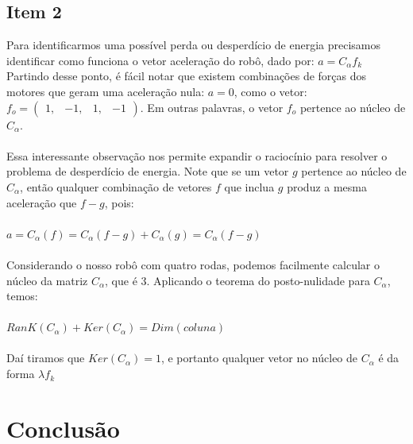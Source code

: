 \documentclass{article}
\begin{document}
\subsection{Item 2}
Para identificarmos uma possível perda ou desperdício de energia precisamos identificar como funciona o vetor aceleração do robô, dado por: 
$ a = C_{\alpha}f_{k}$ Partindo desse ponto, é fácil notar que existem combinações de forças dos motores que geram uma aceleração nula:
$ a = 0 $, como o vetor: $f_{o} = \begin{pmatrix} 1,&-1,&1,&-1\end{pmatrix}$. Em outras palavras, o vetor $f_{o}$ pertence ao núcleo de $C_{\alpha}$.
\\ \\
Essa interessante observação nos permite expandir o raciocínio para resolver o problema de desperdício de energia. Note que se um vetor $g$ pertence ao núcleo de $C_{\alpha}$, então qualquer combinação de vetores $f$ que inclua $g$
produz a mesma aceleração que $f - g$, pois:\\
\\  $ a = C_{\alpha}(f) = C_{\alpha}(f-g) + C_{\alpha}(g) = C_{\alpha}(f-g)$
\\ \\
Considerando o nosso robô com quatro rodas, podemos facilmente calcular o núcleo da matriz $C_{\alpha}$, que é 3.
Aplicando o teorema do posto-nulidade para $C_{\alpha}$, temos:
\\  \\ $ RanK(C_{\alpha}) + Ker(C_{\alpha}) = Dim(coluna)$ \\ \\
Daí tiramos que $Ker(C_{\alpha}) = 1 $, e portanto qualquer vetor no núcleo de $C_{\alpha}$ é da forma $\lambda f_{k}$

\section{Conclusão}
\end{document}
